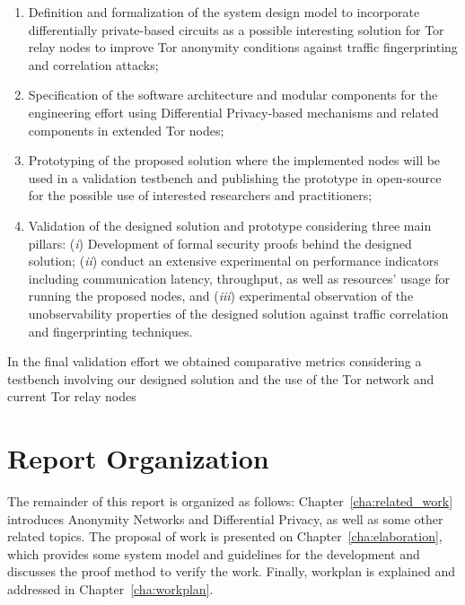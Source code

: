 \begin{enumerate}
    \item Definition and formalization of the system design model to incorporate differentially private-based circuits as a possible interesting solution for Tor relay nodes to improve Tor anonymity conditions against traffic fingerprinting and correlation attacks;

    \item Specification of the software architecture and modular components for the engineering effort using Differential Privacy-based mechanisms and related components in extended Tor nodes;
   
    \item Prototyping of the proposed solution where the implemented nodes will be used in a validation testbench and publishing the prototype in open-source for the possible use of interested researchers and practitioners;
   
    \item Validation of the designed solution and prototype considering three main pillars: (\emph{i}) Development of formal security proofs behind the designed solution; (\emph{ii}) conduct an extensive experimental on performance indicators including communication latency, throughput, as well as resources' usage for running the proposed nodes, and (\emph{iii}) experimental observation of the unobservability properties of the designed solution against traffic correlation and fingerprinting techniques. 
   
\end{enumerate}

In the final validation effort we obtained comparative metrics considering a testbench involving our designed solution and the use of the Tor network and current Tor relay nodes


\section{Report Organization}\label{sec:report_organization}
The remainder of this report is organized as follows: Chapter~\ref{cha:related_work} introduces Anonymity Networks and Differential Privacy, as well as some other related topics. The proposal of work is presented on Chapter~\ref{cha:elaboration}, which provides some system model and guidelines for the development and discusses the proof method to verify the work. Finally, workplan is explained and addressed in Chapter~\ref{cha:workplan}.